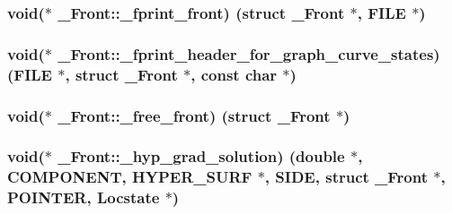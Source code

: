 \subsubsection[{\texorpdfstring{\+\_\+fprint\+\_\+front}{_fprint_front}}]{\setlength{\rightskip}{0pt plus 5cm}void($\ast$ \+\_\+\+Front\+::\+\_\+fprint\+\_\+front) (struct {\bf \+\_\+\+Front} $\ast$, F\+I\+LE $\ast$)}\hypertarget{struct___front_a8c2d7729f088b3a24f7ed40a1f379b10}{}\label{struct___front_a8c2d7729f088b3a24f7ed40a1f379b10}
\subsubsection[{\texorpdfstring{\+\_\+fprint\+\_\+header\+\_\+for\+\_\+graph\+\_\+curve\+\_\+states}{_fprint_header_for_graph_curve_states}}]{\setlength{\rightskip}{0pt plus 5cm}void($\ast$ \+\_\+\+Front\+::\+\_\+fprint\+\_\+header\+\_\+for\+\_\+graph\+\_\+curve\+\_\+states) (F\+I\+LE $\ast$, struct {\bf \+\_\+\+Front} $\ast$, const char $\ast$)}\hypertarget{struct___front_a6f950320cbeda63a0b7de655b59185b0}{}\label{struct___front_a6f950320cbeda63a0b7de655b59185b0}
\subsubsection[{\texorpdfstring{\+\_\+free\+\_\+front}{_free_front}}]{\setlength{\rightskip}{0pt plus 5cm}void($\ast$ \+\_\+\+Front\+::\+\_\+free\+\_\+front) (struct {\bf \+\_\+\+Front} $\ast$)}\hypertarget{struct___front_a7feddc0965b3e3d7047d38831701ed1a}{}\label{struct___front_a7feddc0965b3e3d7047d38831701ed1a}
\subsubsection[{\texorpdfstring{\+\_\+hyp\+\_\+grad\+\_\+solution}{_hyp_grad_solution}}]{\setlength{\rightskip}{0pt plus 5cm}void($\ast$ \+\_\+\+Front\+::\+\_\+hyp\+\_\+grad\+\_\+solution) (double $\ast$, {\bf C\+O\+M\+P\+O\+N\+E\+NT}, {\bf H\+Y\+P\+E\+R\+\_\+\+S\+U\+RF} $\ast$, {\bf S\+I\+DE}, struct {\bf \+\_\+\+Front} $\ast$, {\bf P\+O\+I\+N\+T\+ER}, {\bf Locstate} $\ast$)}\hypertarget{struct___front_afeb6d0e1014e68c823ef3a35546d71fc}{}\label{struct___front_afeb6d0e1014e68c823ef3a35546d71fc}
